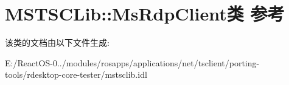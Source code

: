 \hypertarget{class_m_s_t_s_c_lib_1_1_ms_rdp_client}{}\section{M\+S\+T\+S\+C\+Lib\+:\+:Ms\+Rdp\+Client类 参考}
\label{class_m_s_t_s_c_lib_1_1_ms_rdp_client}


该类的文档由以下文件生成\+:\begin{DoxyCompactItemize}
\item 
E\+:/\+React\+O\+S-\/0../modules/rosapps/applications/net/tsclient/porting-\/tools/rdesktop-\/core-\/tester/mstsclib.\+idl\end{DoxyCompactItemize}
